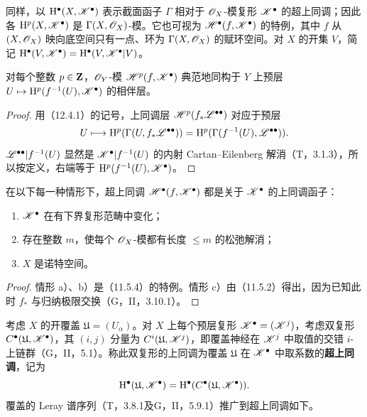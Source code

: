 同样，以 $\mathrm H^\bullet(X,\mathscr K^\bullet)$ 表示截面函子 $\Gamma$ 相对于 $\mathscr O_X$-模复形 $\mathscr K^\bullet$ 的超上同调；因此各 $\mathrm H^p(X,\mathscr K^\bullet)$ 是 $\Gamma(X,\mathscr O_X)$-模。它也可视为 $\mathscr H^\bullet(f,\mathscr K^\bullet)$ 的特例，其中 $f$ 从 $(X,\mathscr O_X)$ 映向底空间只有一点、环为 $\Gamma(X,\mathscr O_X)$ 的赋环空间。对 $X$ 的开集 $V$，简记 $\mathrm H^\bullet(V,\mathscr K^\bullet)=\mathrm H^\bullet(V,\mathscr K^\bullet|V)$。

对每个整数 $p\in\mathbf Z$，$\mathscr O_Y$-模 $\mathscr H^p(f,\mathscr K^\bullet)$ 典范地同构于 $Y$ 上预层 $U\mapsto\mathrm H^p(f^{-1}(U),\mathscr K^\bullet)$ 的相伴层。
\begin{proof}
用（12.4.1）的记号，上同调层 $\mathscr H^p(f_*\mathscr L^{\bullet\bullet})$ 对应于预层
\[
U\longmapsto\mathrm H^p(\Gamma(U,f_*\mathscr L^{\bullet\bullet}))
=\mathrm H^p(\Gamma(f^{-1}(U),\mathscr L^{\bullet\bullet})).
\]
$\mathscr L^{\bullet\bullet}|f^{-1}(U)$ 显然是 $\mathscr K^\bullet|f^{-1}(U)$ 的内射 Cartan--Eilenberg 解消（T，3.1.3），所以按定义，右端等于 $\mathrm H^p(f^{-1}(U),\mathscr K^\bullet)$。
\end{proof}

在以下每一种情形下，超上同调 $\mathscr H^\bullet(f,\mathscr K^\bullet)$ 都是关于 $\mathscr K^\bullet$ 的上同调函子：
\begin{enumerate}[label=\alph*)]
\item $\mathscr K^\bullet$ 在有下界复形范畴中变化；
\item 存在整数 $m$，使每个 $\mathscr O_X$-模都有长度 $\leq m$ 的松弛解消；
\item $X$ 是诺特空间。
\end{enumerate}
\begin{proof}
情形 a）、b）是（11.5.4）的特例。情形 c）由（11.5.2）得出，因为已知此时 $f_*$ 与归纳极限交换（G，II，3.10.1）。
\end{proof}

考虑 $X$ 的开覆盖 $\mathfrak U=(U_\alpha)$。对 $X$ 上每个预层复形 $\mathscr K^\bullet=(\mathscr K^j)$，考虑双复形 $C^\bullet(\mathfrak U,\mathscr K^\bullet)$，其 $(i,j)$ 分量为 $C^i(\mathfrak U,\mathscr K^j)$，即覆盖神经在 $\mathscr K^j$ 中取值的交错 $i$-上链群（G，II，5.1）。称此双复形的上同调为覆盖 $\mathfrak U$ 在 $\mathscr K^\bullet$ 中取系数的\textbf{超上同调}，记为
\[
\mathrm H^\bullet(\mathfrak U,\mathscr K^\bullet)
=\mathrm H^\bullet(C^\bullet(\mathfrak U,\mathscr K^\bullet)).
\]
覆盖的 Leray 谱序列（T，3.8.1及G，II，5.9.1）推广到超上同调如下。

